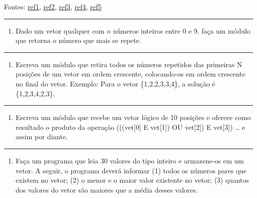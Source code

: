 \documentclass[12pt,a4paper]{article}
\providecommand{\tightlist}{%
      \setlength{\itemsep}{0pt}\setlength{\parskip}{0pt}}
\begin{document}
Fontes:
\href{http://www.deinf.ufma.br/~csalles/prog/prog_lista2.pdf}{ref1},
\href{http://www.sistemas24horas.com.br/aulas/files_dic1/lista-exercicios-vetores-1.pdf}{ref2},
\href{https://fit.faccat.br/~fpereira/apostilas/exerc_resp_alg_mar2007.pdf}{ref3},
\href{https://docplayer.com.br/54457072-Laboratorio-de-programacao-a-exercicios-sobre-vetores-e-matrizes.html}{ref4},
\href{https://docplayer.com.br/21195395-Exercicios-vetores-e-matrizes.html}{ref5}

    \begin{center}\rule{0.5\linewidth}{0.5pt}\end{center}

\begin{enumerate}
\def\labelenumi{\arabic{enumi}.}
\tightlist
\item
  Dado um vetor qualquer com \(n\) números inteiros entre 0 e 9, faça um
  módulo que retorna o número que mais se repete.
\end{enumerate}

    \begin{center}\rule{0.5\linewidth}{0.5pt}\end{center}

\begin{enumerate}
\def\labelenumi{\arabic{enumi}.}
\setcounter{enumi}{1}
\tightlist
\item
  Escreva um módulo que retira todos os números repetidos das primeiras
  N posições de um vetor em ordem crescente, colocando-os em ordem
  crescente no final do vetor. Exemplo: Para o vetor \{1,2,2,3,3,4\}, a
  solução é \{1,2,3,4,2,3\}.
\end{enumerate}

    \begin{center}\rule{0.5\linewidth}{0.5pt}\end{center}

\begin{enumerate}
\def\labelenumi{\arabic{enumi}.}
\setcounter{enumi}{2}
\tightlist
\item
  Escreva um módulo que recebe um vetor lógico de 10 posições e oferece
  como resultado o produto da operação (((vet{[}0{]} E vet{[}1{]}) OU
  vet{[}2{]}) E vet{[}3{]}) \ldots{} e assim por diante.
\end{enumerate}

    \begin{center}\rule{0.5\linewidth}{0.5pt}\end{center}

\begin{enumerate}
\def\labelenumi{\arabic{enumi}.}
\setcounter{enumi}{3}
\tightlist
\item
  Faça um programa que leia 30 valores do tipo inteiro e armazene-os em
  um vetor. A seguir, o programa deverá informar (1) todos os números
  pares que existem no vetor; (2) o menor e o maior valor existente no
  vetor; (3) quantos dos valores do vetor são maiores que a média desses
  valores.
\end{enumerate}
\end{document}
